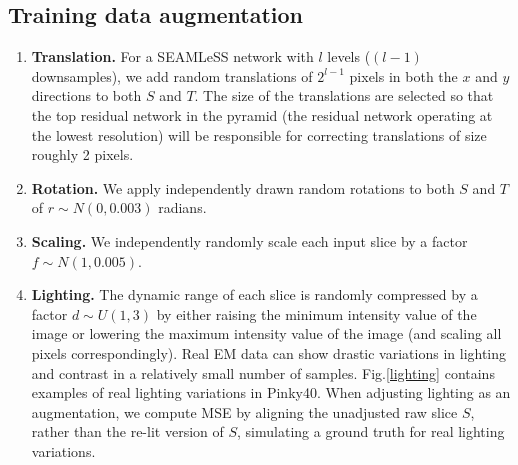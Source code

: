 \documentclass{article}
\begin{document}
\subsection{Training data augmentation}\label{augmentation}
\begin{enumerate}
\item \textbf{Translation.} For a SEAMLeSS network with $l$ levels ($(l-1)$ downsamples), we add random translations of $2^{l-1}$ pixels in both the $x$ and $y$ directions to both $S$ and $T$. The size of the translations are selected so that the top residual network in the pyramid (the residual network operating at the lowest resolution) will be responsible for correcting translations of size roughly 2 pixels.
\item \textbf{Rotation.} We apply independently drawn random rotations to both $S$ and $T$ of $r\sim N(0,0.003)$ radians.
\item \textbf{Scaling.} We independently randomly scale each input slice by a factor $f\sim N(1,0.005)$.
\item \textbf{Lighting.} The dynamic range of each slice is randomly compressed by a factor $d\sim U(1,3)$ by either raising the minimum intensity value of the image or lowering the maximum intensity value of the image (and scaling all pixels correspondingly). Real EM data can show drastic variations in lighting and contrast in a relatively small number of samples. Fig.\ref{lighting} contains examples of real lighting variations in Pinky40. When adjusting lighting as an augmentation, we compute MSE by aligning the unadjusted raw slice $S$, rather than the re-lit version of $S$, simulating a ground truth for real lighting variations. 
\begin{figure}[!ht]
	\centering

\end{figure}
\end{enumerate}
\end{document}
